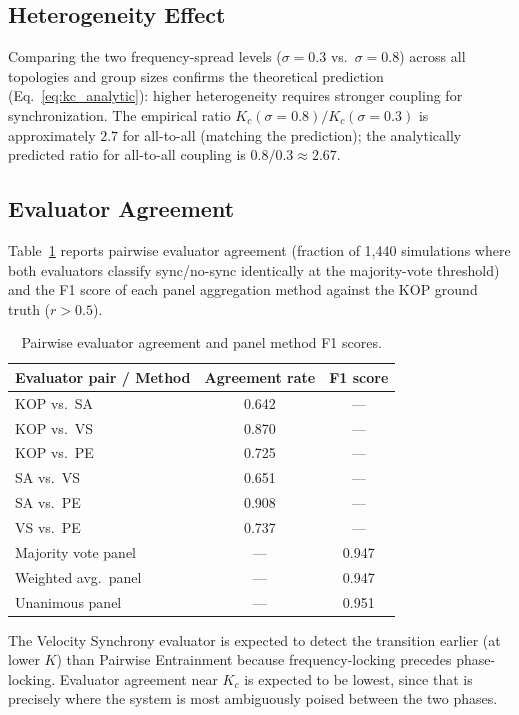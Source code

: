 \documentclass[11pt]{article}
\begin{document}
\subsection{Heterogeneity Effect}

Comparing the two frequency-spread levels ($\sigma = 0.3$ vs.\ $\sigma = 0.8$)
across all topologies and group sizes confirms the theoretical prediction
(Eq.~\eqref{eq:kc_analytic}): higher heterogeneity requires stronger coupling for
synchronization. The empirical ratio $K_c(\sigma{=}0.8) / K_c(\sigma{=}0.3)$ is
approximately $2.7$ for all-to-all (matching the prediction); the analytically predicted ratio for all-to-all coupling is
$0.8 / 0.3 \approx 2.67$.

\subsection{Evaluator Agreement}

Table~\ref{tab:agreement} reports pairwise evaluator agreement (fraction of
1,440 simulations where both evaluators classify sync/no-sync identically at the
majority-vote threshold) and the F1 score of each panel aggregation method against
the KOP ground truth ($r > 0.5$).

\begin{table}[h]
\centering
\small
\caption{Pairwise evaluator agreement and panel method F1 scores.}
\label{tab:agreement}
\begin{tabular}{lcc}
\toprule
\textbf{Evaluator pair / Method} & \textbf{Agreement rate} & \textbf{F1 score} \\
\midrule
KOP vs.\ SA           & 0.642 & --- \\
KOP vs.\ VS           & 0.870 & --- \\
KOP vs.\ PE           & 0.725 & --- \\
SA vs.\ VS            & 0.651 & --- \\
SA vs.\ PE            & 0.908 & --- \\
VS vs.\ PE            & 0.737 & --- \\
\midrule
Majority vote panel   & --- & 0.947 \\
Weighted avg.\ panel  & --- & 0.947 \\
Unanimous panel       & --- & 0.951 \\
\bottomrule
\end{tabular}
\end{table}

The Velocity Synchrony evaluator is expected to detect the transition earlier (at lower
$K$) than Pairwise Entrainment because frequency-locking precedes phase-locking.
Evaluator agreement near $K_c$ is expected to be lowest, since that is precisely where
the system is most ambiguously poised between the two phases.
\end{document}

